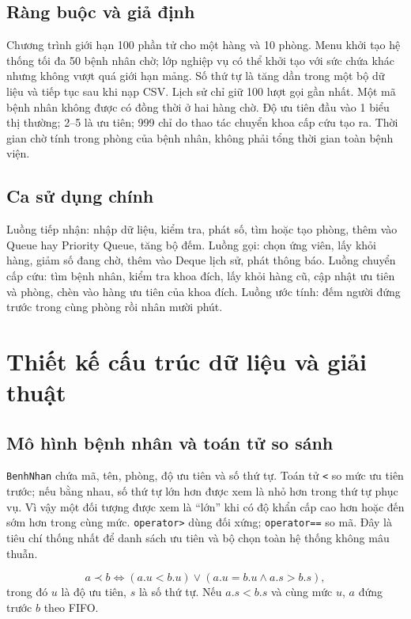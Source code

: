 \documentclass[12pt,a4paper,oneside]{report}
\begin{document}
\section{Ràng buộc và giả định}
Chương trình giới hạn 100 phần tử cho một hàng và 10 phòng. Menu khởi tạo hệ thống tối đa 50 bệnh nhân chờ; lớp nghiệp vụ có thể khởi tạo với sức chứa khác nhưng không vượt quá giới hạn mảng. Số thứ tự là tăng dần trong một bộ dữ liệu và tiếp tục sau khi nạp CSV. Lịch sử chỉ giữ 100 lượt gọi gần nhất. Một mã bệnh nhân không được có đồng thời ở hai hàng chờ. Độ ưu tiên đầu vào 1 biểu thị thường; 2--5 là ưu tiên; 999 chỉ do thao tác chuyển khoa cấp cứu tạo ra. Thời gian chờ tính trong phòng của bệnh nhân, không phải tổng thời gian toàn bệnh viện.

\section{Ca sử dụng chính}
Luồng tiếp nhận: nhập dữ liệu, kiểm tra, phát số, tìm hoặc tạo phòng, thêm vào Queue hay Priority Queue, tăng bộ đếm. Luồng gọi: chọn ứng viên, lấy khỏi hàng, giảm số đang chờ, thêm vào Deque lịch sử, phát thông báo. Luồng chuyển cấp cứu: tìm bệnh nhân, kiểm tra khoa đích, lấy khỏi hàng cũ, cập nhật ưu tiên và phòng, chèn vào hàng ưu tiên của khoa đích. Luồng ước tính: đếm người đứng trước trong cùng phòng rồi nhân mười phút.

\chapter{Thiết kế cấu trúc dữ liệu và giải thuật}
\section{Mô hình bệnh nhân và toán tử so sánh}
\texttt{BenhNhan} chứa mã, tên, phòng, độ ưu tiên và số thứ tự. Toán tử \texttt{<} so mức ưu tiên trước; nếu bằng nhau, số thứ tự lớn hơn được xem là nhỏ hơn trong thứ tự phục vụ. Vì vậy một đối tượng được xem là ``lớn'' khi có độ khẩn cấp cao hơn hoặc đến sớm hơn trong cùng mức. \texttt{operator>} dùng đối xứng; \texttt{operator==} so mã. Đây là tiêu chí thống nhất để danh sách ưu tiên và bộ chọn toàn hệ thống không mâu thuẫn.

\begin{equation}
a \prec b \Leftrightarrow (a.u < b.u) \lor (a.u=b.u \land a.s>b.s),
\end{equation}
trong đó $u$ là độ ưu tiên, $s$ là số thứ tự. Nếu $a.s<b.s$ và cùng mức $u$, $a$ đứng trước $b$ theo FIFO.
\end{document}
